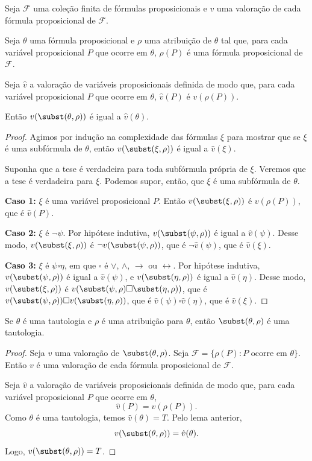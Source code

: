 \begin{metalemma}
    Seja $\mathcal F$ uma coleção finita de fórmulas proposicionais e $v$ uma valoração de cada fórmula proposicional de $\mathcal F$.

    Seja $\theta$ uma fórmula proposicional e $\rho$ uma atribuição de $\theta$ tal que, para cada variável proposicional $P$ que ocorre em $\theta$, $\rho(P)$ é uma fórmula proposicional de $\mathcal F$.

    Seja $\hat v$ a valoração de variáveis proposicionais definida de modo que, para cada variável proposicional $P$ que ocorre em $\theta$, $\hat v(P)$ é $v(\rho(P))$.

    Então $v(\subst(\theta, \rho))$ é igual a $\hat v(\theta)$.
\end{metalemma}

\begin{proof}
    Agimos por indução na complexidade das fórmulas $\xi$ para mostrar que se $\xi$ é uma subfórmula de $\theta$, então $v(\subst(\xi, \rho))$ é igual a $\hat v(\xi)$.

    Suponha que a tese é verdadeira para toda subfórmula própria de $\xi$.
    Veremos que a tese é verdadeira para $\xi$.
    Podemos supor, então, que $\xi$ é uma subfórmula de $\theta$.

    \textbf{Caso 1:} $\xi$ é uma variável proposicional $P$.
    Então $v(\subst(\xi, \rho))$ é $v(\rho(P))$, que é $\hat v(P)$.

    \textbf{Caso 2:} $\xi$ é $\neg \psi$.
    Por hipótese indutiva, $v(\subst(\psi, \rho))$ é igual a $\hat v(\psi)$.
    Desse modo, $v(\subst(\xi, \rho))$ é $\neg v(\subst(\psi, \rho))$, que é $\neg \hat v(\psi)$, que é $\hat v(\xi)$.

    \textbf{Caso 3:} $\xi$ é $ \psi \square \eta$, em que $\square$ é $\vee$, $\wedge$, $\rightarrow$ ou $\leftrightarrow$.
    Por hipótese indutiva, $v(\subst(\psi, \rho))$ é igual a $\hat v(\psi)$, e $v(\subst(\eta, \rho))$ é igual a $\hat v(\eta)$.
    Desse modo, $v(\subst(\xi, \rho))$ é $v(\subst(\psi, \rho) \square \subst(\eta, \rho))$, que é $v(\subst(\psi, \rho)) \square v(\subst(\eta, \rho))$, que é $\hat v(\psi) \square \hat v(\eta)$, que é $\hat v(\xi)$.
\end{proof}

\begin{metacorollary}
    Se $\theta$ é uma tautologia e $\rho$ é uma atribuição para $\theta$, então $\subst(\theta,\rho)$ é uma tautologia.
\end{metacorollary}
\begin{proof}
    Seja $v$ uma valoração de $\subst(\theta,\rho)$.
    Seja $\mathcal F=\{\rho(P): P \text{ ocorre em } \theta\}$.
    Então $v$ é uma valoração de cada fórmula proposicional de $\mathcal F$.

    Seja $\hat v$ a valoração de variáveis proposicionais definida de modo que, para cada variável proposicional $P$ que ocorre em $\theta$,
    \[
        \hat v(P)=v(\rho(P)).
    \]
    Como $\theta$ é uma tautologia, temos $\hat v(\theta)=T$.
    Pelo lema anterior,
    \[
        v(\subst(\theta,\rho))=\hat v(\theta).
    \]
    Logo, $v(\subst(\theta,\rho))=T$.
\end{proof}

